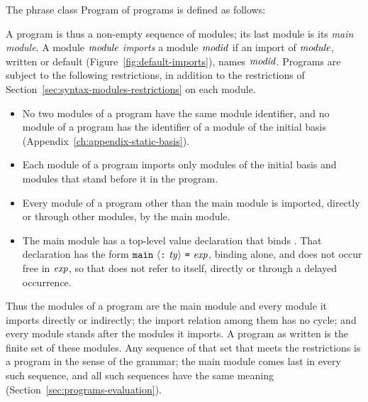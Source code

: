 The phrase class Program of programs is defined as follows:
\begin{center}
\begin{grammar}
\gprod{\program}{\modm\ \opt{\program}}{}
\end{grammar}
\end{center}
A program is thus a non-empty sequence of modules; its last module is its
\emph{main module}. A module $\mathit{module}$ \emph{imports} a module $\mathit{modid}$ if an
import of $\mathit{module}$, written or default (Figure~\ref{fig:default-imports}),
names $\mathit{modid}$. Programs are subject to the following restrictions, in
addition to the restrictions of Section~\ref{sec:syntax-modules-restrictions}
on each module.
\begin{itemize}
\item{} No two modules of a program have the same module identifier, and no
  module of a program has the identifier of a module of the initial basis
  (Appendix~\ref{ch:appendix-static-basis}). %
\item{} Each module of a program imports only modules of the initial basis and
  modules that stand before it in the program.
\item{} Every module of a program other than the main module is imported,
  directly or through other modules, by the main module.
\item{} The main module has a top-level value declaration that binds
  . That declaration has the form
  $\kw{main}\ \opt{\kw{:}\ \ty}\ \kw{=}\ \expm$, binding  alone,
  and  does not occur free in $\mathit{exp}$, so that  does not
  refer to itself, directly or through a delayed occurrence. %
\end{itemize}
Thus the modules of a program are the main module and every module it
imports directly or indirectly; the import relation among them has no cycle;
and every module stands after the modules it imports. A program as written is
the finite set of these modules. Any sequence of that set that meets the
restrictions is a program in the sense of the grammar; the main module comes
last in every such sequence, and all such sequences have the same meaning
(Section~\ref{sec:programs-evaluation}).

